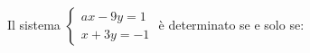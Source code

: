 Il sistema 
$\displaystyle
\left\{
\begin{array}{l}
\displaystyle ax - 9y = 1 \\
\displaystyle x + 3y = -1
\end{array}
\right.
$
è determinato se e solo se: 
